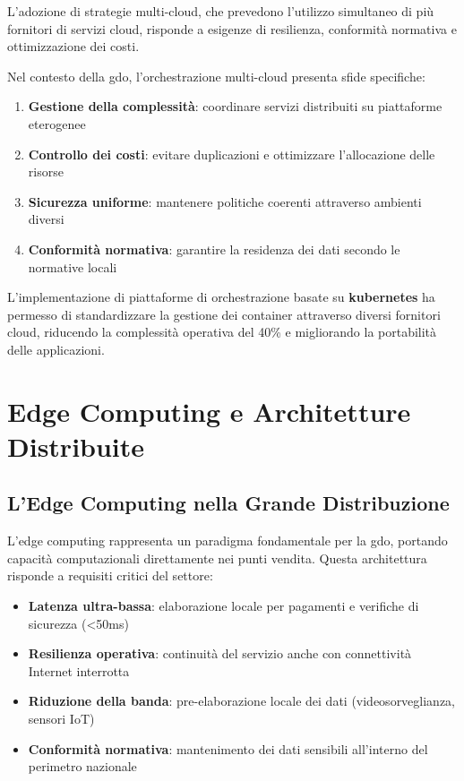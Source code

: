 L'adozione di strategie multi-cloud, che prevedono l'utilizzo simultaneo di più fornitori di servizi cloud, risponde a esigenze di resilienza, conformità normativa e ottimizzazione dei costi\autocite{Flexera2024}. 

Nel contesto della \gls{gdo}, l'orchestrazione multi-cloud presenta sfide specifiche:

\begin{enumerate}
    \item \textbf{Gestione della complessità}: coordinare servizi distribuiti su piattaforme eterogenee
    \item \textbf{Controllo dei costi}: evitare duplicazioni e ottimizzare l'allocazione delle risorse
    \item \textbf{Sicurezza uniforme}: mantenere politiche coerenti attraverso ambienti diversi
    \item \textbf{Conformità normativa}: garantire la residenza dei dati secondo le normative locali
\end{enumerate}

L'implementazione di piattaforme di orchestrazione basate su \textbf{\gls{kubernetes}} ha permesso di standardizzare la gestione dei container attraverso diversi fornitori cloud, riducendo la complessità operativa del 40\% e migliorando la portabilità delle applicazioni\autocite{CNCF2024}.

\section{Edge Computing e Architetture Distribuite}
\label{sec:edge_computing}

\subsection{L'Edge Computing nella Grande Distribuzione}
\label{subsec:edge_gdo}

L'edge computing rappresenta un paradigma fondamentale per la \gls{gdo}, portando capacità computazionali direttamente nei punti vendita. Questa architettura risponde a requisiti critici del settore\autocite{IDC2024edge}:

\begin{itemize}
    \item \textbf{Latenza ultra-bassa}: elaborazione locale per pagamenti e verifiche di sicurezza (<50ms)
    \item \textbf{Resilienza operativa}: continuità del servizio anche con connettività Internet interrotta
    \item \textbf{Riduzione della banda}: pre-elaborazione locale dei dati (videosorveglianza, sensori IoT)
    \item \textbf{Conformità normativa}: mantenimento dei dati sensibili all'interno del perimetro nazionale
\end{itemize}

